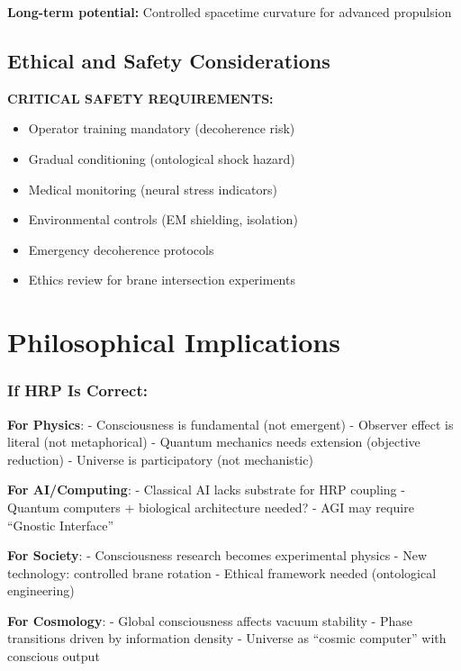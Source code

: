 \textbf{Long-term potential:} Controlled spacetime curvature for advanced propulsion

\subsection{Ethical and Safety Considerations}
\label{subsec:app-ethics}

\begin{warningbox}
\textbf{CRITICAL SAFETY REQUIREMENTS:}
\begin{itemize}
\item Operator training mandatory (decoherence risk)
\item Gradual conditioning (ontological shock hazard)
\item Medical monitoring (neural stress indicators)
\item Environmental controls (EM shielding, isolation)
\item Emergency decoherence protocols
\item Ethics review for brane intersection experiments
\end{itemize}
\end{warningbox}

\section{Philosophical Implications}
\label{sec:implications}

\subsubsection{If HRP Is Correct:}\label{if-hrp-is-correct}

\textbf{For Physics}: - Consciousness is fundamental (not emergent) -
Observer effect is literal (not metaphorical) - Quantum mechanics needs
extension (objective reduction) - Universe is participatory (not
mechanistic)

\textbf{For AI/Computing}: - Classical AI lacks substrate for HRP
coupling - Quantum computers + biological architecture needed? - AGI may
require ``Gnostic Interface''

\textbf{For Society}: - Consciousness research becomes experimental
physics - New technology: controlled brane rotation - Ethical framework
needed (ontological engineering)

\textbf{For Cosmology}: - Global consciousness affects vacuum stability
- Phase transitions driven by information density - Universe as ``cosmic
computer'' with conscious output

